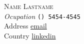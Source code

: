 \documentclass[9pt, a4paper]{article}
\begin{document}
\noindent

\begin{flushleft}
\textsc{\huge Name Lastname}\\[.2cm]
\emph{\large Ocupation}                \hfill      \faPhone        \space  \footnotesize{\texttt{() 5454-4545}}\\
\faMapMarker \space Address             \hfill      \faEnvelope     \space  \href{mailto:email}{email}\\
Country                                 \hfill      \faLinkedin     \space  \href{linkedin}{linkedin}\\[.2cm]
\end{flushleft}


\onehalfspacing




\end{document}

